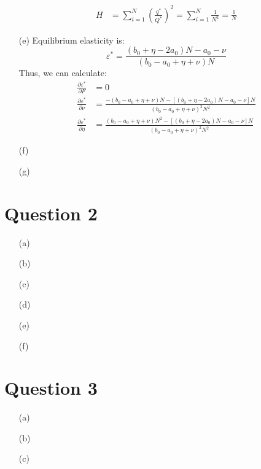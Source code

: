 \documentclass{article}
\newcommand{\pl}{\partial}
\begin{document}
\begin{itemize}
\begin{align*}
      H &= \sum_{i=1}^N\left(\frac{q^*}{Q^*}\right)^2 = \sum_{i=1}^N\frac{1}{N^2} = \frac{1}{N}
    \end{align*} 
    \item[(e)] Equilibrium elasticity is: \[
      \varepsilon^* = \frac{(b_0 + \eta - 2a_0)N - a_0 - \nu}{(b_0 - a_0 + \eta + \nu)N}
    \]
    Thus, we can calculate:\begin{align*}
      \frac{\pl\varepsilon^*}{\pl F}    &= 0  \\
      \frac{\pl\varepsilon^*}{\pl \nu}  &= \frac{-(b_0 - a_0 + \eta + \nu)N - [(b_0 + \eta - 2a_0)N - a_0 - \nu]N}{(b_0 - a_0 + \eta + \nu)^2N^2}   \\
      \frac{\pl\varepsilon^*}{\pl \eta} &= \frac{(b_0 - a_0 + \eta + \nu)N^2- [(b_0 + \eta - 2a_0)N - a_0 - \nu]N}{(b_0 - a_0 + \eta + \nu)^2N^2}
    \end{align*}
    \item[(f)]
    \item[(g)]
\end{itemize}

\section*{Question 2}
\begin{itemize}
    \item[(a)]
    \item[(b)]
    \item[(c)]
    \item[(d)]
    \item[(e)]
    \item[(f)]
\end{itemize}


\section*{Question 3}
\begin{itemize}
    \item[(a)]
    \item[(b)]
    \item[(c)]
\end{itemize}

\end{document}
